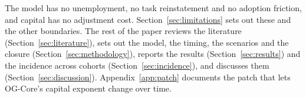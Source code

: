The model has no unemployment, no task reinstatement and no adoption friction, and capital has no adjustment cost. Section~\ref{sec:limitations} sets out these and the other boundaries. The rest of the paper reviews the literature (Section~\ref{sec:literature}), sets out the model, the timing, the scenarios and the closure (Section~\ref{sec:methodology}), reports the results (Section~\ref{sec:results}) and the incidence across cohorts (Section~\ref{sec:incidence}), and discusses them (Section~\ref{sec:discussion}). Appendix~\ref{app:patch} documents the patch that lets OG-Core's capital exponent change over time.
